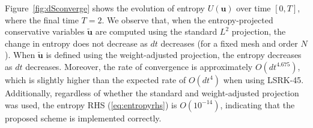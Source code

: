 \documentclass[preprint,10pt]{article}
\theoremstyle{definition}
\theoremstyle{lemma}
\theoremstyle{theorem}
\theoremstyle{assumption}
\renewcommand{\tilde}{\widetilde}
\begin{document}
{Figure~\ref{fig:dSconverge} shows the evolution of entropy $U(\bm{u})$ over time $[0,T]$, where the final time $T = 2$.  We observe that, when the entropy-projected conservative variables $\tilde{\bm{u}}$ are computed using the standard $L^2$ projection, the change in entropy does not decrease as $dt$ decreases (for a fixed mesh and order $N$).  When $\tilde{\bm{u}}$ is defined using the weight-adjusted projection, the entropy decreases as $dt$ decreases.  Moreover, the rate of convergence is approximately $O(dt^{4.675})$, which is slightly higher than the expected rate of $O(dt^4)$ when using LSRK-45.  Additionally, regardless of whether the standard and weight-adjusted projection was used, the entropy RHS (\ref{eq:entropyrhs}) is $O(10^{-14})$, indicating that the proposed scheme is implemented correctly.  

\begin{figure}
\centering
{}
\end{figure}}
\end{document}
